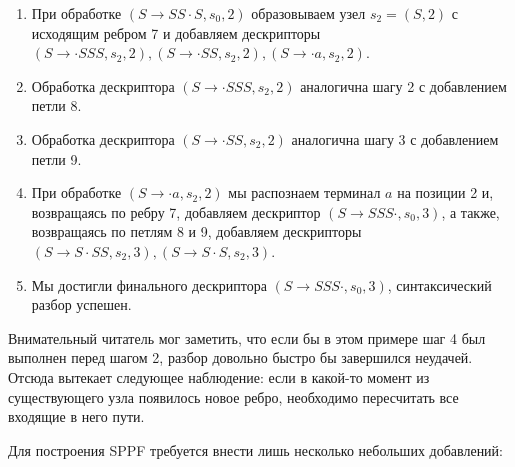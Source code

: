 \begin{example}
\begin{enumerate}
    \item При обработке $ (S \to S S \cdot S, s_0, 2) $ образовываем узел $s_2 = (S, 2)$ с исходящим ребром 7 и добавляем дескрипторы $ (S \to \cdot SSS, s_2, 2), (S \to \cdot SS, s_2, 2), (S \to \cdot a, s_2, 2) $.

    \begin{center}
      
    \end{center}

    \item Обработка дескриптора $ (S \to \cdot S S S, s_2, 2) $ аналогична шагу 2 с добавлением петли 8.

    \begin{center}
      
    \end{center}

    \item Обработка дескриптора $ (S \to \cdot S S, s_2, 2) $ аналогична шагу 3 с добавлением петли 9.

    \begin{center}
      
    \end{center}

    \item При обработке $ (S \to \cdot a, s_2, 2) $ мы распознаем терминал $a$ на позиции 2 и, возвращаясь по ребру 7, добавляем дескриптор $ (S \to S S S \cdot, s_0, 3) $, а также, возвращаясь по петлям 8 и 9, добавляем дескрипторы $ (S \to S \cdot S S, s_2, 3), (S \to S \cdot S, s_2, 3) $.

    \item Мы достигли финального дескриптора $ (S \to S S S \cdot, s_0, 3) $, синтаксический разбор успешен.
  \end{enumerate}

\end{example}

Внимательный читатель мог заметить, что если бы в этом примере шаг 4 был выполнен перед шагом 2, разбор довольно быстро бы завершился неудачей. Отсюда вытекает следующее наблюдение: если в какой-то момент из существующего узла появилось новое ребро, необходимо пересчитать все входящие в него пути.

Для построения SPPF требуется внести лишь несколько небольших добавлений:

